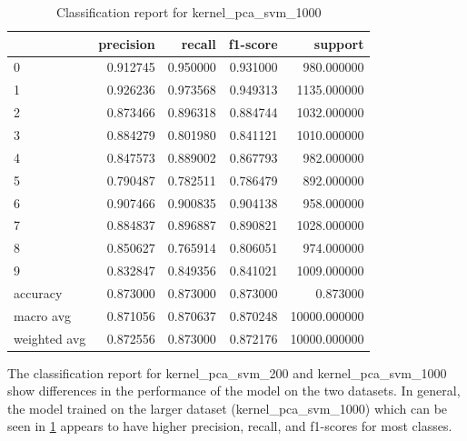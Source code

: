\begin{table}[htb!]
    \centering
    \caption{Classification report for kernel_pca_svm_1000}
    \label{tab:classification-report-kernel_pca_svm_1000}
    \begin{tabular}{lrrrr}
    \toprule
     & precision & recall & f1-score & support \\
    \midrule
    0 & 0.912745 & 0.950000 & 0.931000 & 980.000000 \\
    1 & 0.926236 & 0.973568 & 0.949313 & 1135.000000 \\
    2 & 0.873466 & 0.896318 & 0.884744 & 1032.000000 \\
    3 & 0.884279 & 0.801980 & 0.841121 & 1010.000000 \\
    4 & 0.847573 & 0.889002 & 0.867793 & 982.000000 \\
    5 & 0.790487 & 0.782511 & 0.786479 & 892.000000 \\
    6 & 0.907466 & 0.900835 & 0.904138 & 958.000000 \\
    7 & 0.884837 & 0.896887 & 0.890821 & 1028.000000 \\
    8 & 0.850627 & 0.765914 & 0.806051 & 974.000000 \\
    9 & 0.832847 & 0.849356 & 0.841021 & 1009.000000 \\
    accuracy & 0.873000 & 0.873000 & 0.873000 & 0.873000 \\
    macro avg & 0.871056 & 0.870637 & 0.870248 & 10000.000000 \\
    weighted avg & 0.872556 & 0.873000 & 0.872176 & 10000.000000 \\
    \bottomrule
    \end{tabular}
    \end{table}

The classification report for kernel_pca_svm_200 and kernel_pca_svm_1000 show differences in the performance of the model on the two datasets. In general, the model trained on the larger dataset (kernel_pca_svm_1000) which can be seen in \ref{tab:classification-report-kernel_pca_svm_1000} appears to have higher precision, recall, and f1-scores for most classes. 

